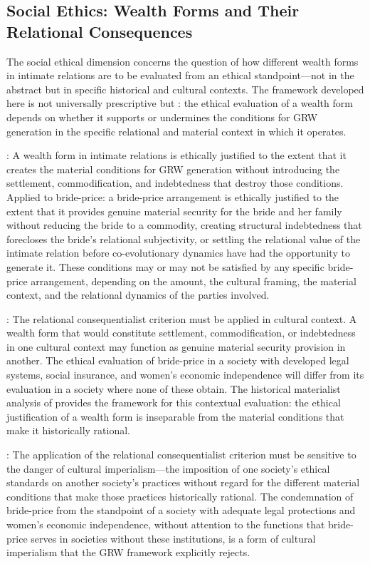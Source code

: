 \subsection{Social Ethics: Wealth Forms and Their Relational Consequences}
\label{p15:subsec:social_ethics}

\noindent
The social ethical dimension concerns the question of how different wealth forms in intimate relations are to be evaluated from an ethical standpoint---not in the abstract but in specific historical and cultural contexts. The framework developed here is not universally prescriptive but : the ethical evaluation of a wealth form depends on whether it supports or undermines the conditions for GRW generation in the specific relational and material context in which it operates.

: A wealth form in intimate relations is ethically justified to the extent that it creates the material conditions for GRW generation without introducing the settlement, commodification, and indebtedness that destroy those conditions. Applied to bride-price: a bride-price arrangement is ethically justified to the extent that it provides genuine material security for the bride and her family without reducing the bride to a commodity, creating structural indebtedness that forecloses the bride's relational subjectivity, or settling the relational value of the intimate relation before co-evolutionary dynamics have had the opportunity to generate it. These conditions may or may not be satisfied by any specific bride-price arrangement, depending on the amount, the cultural framing, the material context, and the relational dynamics of the parties involved.

: The relational consequentialist criterion must be applied in cultural context. A wealth form that would constitute settlement, commodification, or indebtedness in one cultural context may function as genuine material security provision in another. The ethical evaluation of bride-price in a society with developed legal systems, social insurance, and women's economic independence will differ from its evaluation in a society where none of these obtain. The historical materialist analysis of  provides the framework for this contextual evaluation: the ethical justification of a wealth form is inseparable from the material conditions that make it historically rational.

: The application of the relational consequentialist criterion must be sensitive to the danger of cultural imperialism---the imposition of one society's ethical standards on another society's practices without regard for the different material conditions that make those practices historically rational. The condemnation of bride-price from the standpoint of a society with adequate legal protections and women's economic independence, without attention to the functions that bride-price serves in societies without these institutions, is a form of cultural imperialism that the GRW framework explicitly rejects.

